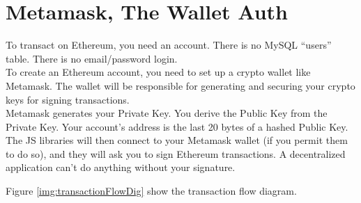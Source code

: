 
\section{Metamask, The Wallet Auth}

To transact on Ethereum, you need an account. There is no MySQL ``users'' table. There is no email/password login. \\[-8pt]

To create an Ethereum account, you need to set up a crypto wallet like Metamask. The wallet will be responsible for generating and securing your crypto keys for signing transactions. \\[-8pt]

Metamask generates your Private Key. You derive the Public Key from the Private Key. Your account's address is the last 20 bytes of a hashed Public Key. \\[-8pt]



The JS libraries will then connect to your Metamask wallet (if you permit them to do so), and they will ask you to sign Ethereum transactions. A decentralized application can't do anything without your signature.

Figure \ref{img:transactionFlowDig} show the transaction flow diagram.

